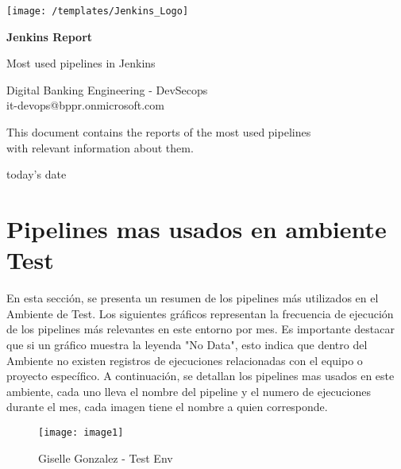 \documentclass{article}
\makeatletter
\def \title{Jenkins Report}
\def \subtitle {Most used pipelines in Jenkins}
\def \authors{
    Digital Banking Engineering - DevSecops\\
    it-devops@bppr.onmicrosoft.com\\

}
\def \Description{
    This document contains the reports of the most used pipelines \\
    with relevant information about them.\\
}
\def \date{today's date}
\makeatother
\begin{document}
\begin{titlepage}
    \begin{center}
        \vspace*{0.7cm}
        
        \texttt{[image: /templates/Jenkins\_Logo]}\\
        
        \vspace{1cm}
        
        \Huge
        \textbf{\title}
            
        \vspace{0.5cm}
        \LARGE
        \subtitle
            
        \vspace{1cm}
        
        \large    
        \authors

        \vspace{2cm}
        
        \Description

        \vspace{2cm}

        \date
        
    \end{center}
\end{titlepage}

\section{Pipelines mas usados en ambiente Test}

\vspace{0.5cm}

En esta sección, se presenta un resumen de los pipelines más utilizados en el Ambiente de Test. Los siguientes gráficos representan la frecuencia de ejecución de los pipelines más relevantes en este entorno por mes.
Es importante destacar que si un gráfico muestra la leyenda "No Data", esto indica que dentro del Ambiente no existen registros de ejecuciones relacionadas con el equipo o proyecto específico.
A continuación, se detallan los pipelines mas usados en este ambiente, cada uno lleva el nombre del pipeline y el numero de ejecuciones durante el mes, cada imagen tiene el nombre a quien corresponde.

\vspace{0.8cm}

\begin{figure}[H]
    \centering
        \texttt{[image: image1]}
        \caption{Giselle Gonzalez - Test Env}
\end{figure}
\end{document}
